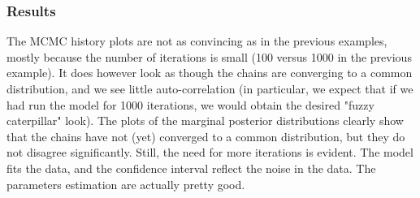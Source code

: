 \documentclass[11pt]{amsart}
\begin{document}
\subsubsection*{Results} The MCMC history plots are not as convincing as in the previous examples, mostly because the number of iterations is small (100 versus 1000 in the previous example). It does however look as though the chains are converging to a common distribution, and we see little auto-correlation (in particular, we  expect that if we had run the model for 1000 iterations, we would obtain the desired "fuzzy caterpillar" look). The plots of the marginal posterior distributions clearly show that the chains have not (yet) converged to a common distribution, but they do not disagree significantly. Still, the need for more iterations is evident. The model fits the data, and the confidence interval reflect the noise in the data. The parameters estimation are actually pretty good.
\end{document}
